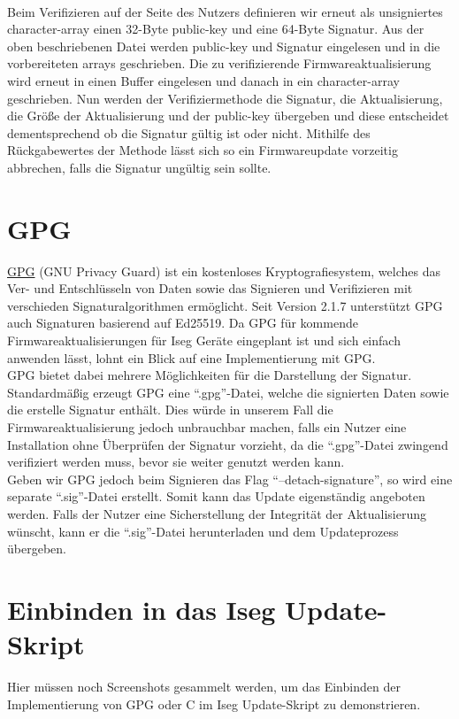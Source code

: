 \documentclass[thesis=bachelor,faculty=cb]{hsmw-thesis}
\begin{document}
{	\\[1cm]
	Beim Verifizieren auf der Seite des Nutzers definieren wir erneut als unsigniertes character-array einen 32-Byte public-key und eine 64-Byte Signatur. Aus der oben beschriebenen Datei werden public-key und Signatur eingelesen und in die vorbereiteten arrays geschrieben.
	Die zu verifizierende Firmwareaktualisierung wird erneut in einen Buffer eingelesen und danach in ein character-array geschrieben.
	Nun werden der Verifiziermethode die Signatur, die Aktualisierung, die Größe der Aktualisierung und der public-key übergeben und diese entscheidet dementsprechend ob die Signatur gültig ist oder nicht. Mithilfe des Rückgabewertes der Methode lässt sich so ein Firmwareupdate vorzeitig abbrechen, falls die Signatur ungültig sein sollte.
	
	
	
	\section{GPG}
	\href{https://www.gnupg.org/}{GPG} (GNU Privacy Guard) ist ein kostenloses Kryptografiesystem, welches das Ver- und Entschlüsseln von Daten sowie das Signieren und Verifizieren mit verschieden Signaturalgorithmen ermöglicht. Seit Version 2.1.7 \cite{GNU217} unterstützt GPG auch Signaturen basierend auf Ed25519. Da GPG für kommende Firmwareaktualisierungen für Iseg Geräte eingeplant ist und sich einfach anwenden lässt, lohnt ein Blick auf eine Implementierung mit GPG. 
	\\[1cm]
	GPG bietet dabei mehrere Möglichkeiten für die Darstellung der Signatur. Standardmäßig erzeugt GPG eine \enquote{.gpg}-Datei, welche die signierten Daten sowie die erstelle Signatur enthält. Dies würde in unserem Fall die Firmwareaktualisierung jedoch unbrauchbar machen, falls ein Nutzer eine Installation ohne Überprüfen der Signatur vorzieht, da die \enquote{.gpg}-Datei zwingend verifiziert werden muss, bevor sie weiter genutzt werden kann.
	\\[1cm]
	Geben wir GPG jedoch beim Signieren das Flag \enquote{--detach-signature}, so wird eine separate \enquote{.sig}-Datei erstellt. Somit kann das Update eigenständig angeboten werden. Falls der Nutzer eine Sicherstellung der Integrität der Aktualisierung wünscht, kann er die \enquote{.sig}-Datei herunterladen und dem Updateprozess übergeben.
	\section{Einbinden in das Iseg Update-Skript}
	Hier müssen noch Screenshots gesammelt werden, um das Einbinden der Implementierung von GPG oder C im Iseg Update-Skript zu demonstrieren.
}
\end{document}
